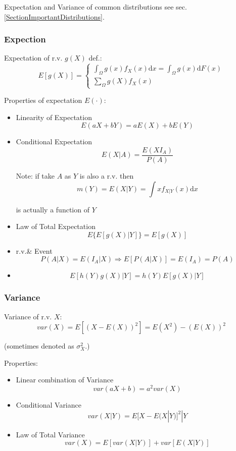    Expectation and Variance of common distributions see sec.\ref{SectionImportantDistributions}.

\subsubsection{Expection}
    Expectation of r.v. $g(X)$ def.:
    \[
    E[g(X)]=\begin{cases}
        {\displaystyle\int_\Omega g(x) f_X(x)\mathrm{d}x=\int_\Omega g(x)\mathrm{d}F(x)}\\
        {\displaystyle\sum_{\Omega}g(X)f_X(x)}
    \end{cases}
\]

    Properties of expectation $E(\cdot)$:
\begin{itemize}
    \item Linearity of Expectation\[
        E(aX+bY)=aE(X)+bE(Y)
    \]
    \item Conditional Expectation\[
        E(X|A)=\frac{E(XI_A)}{P(A)}
    \]
    
    Note: if take $A$ as $Y$ is also a r.v. then 
    \[m(Y)=E(X|Y)=\int xf_{X|Y}(x)\mathrm{d}x\]

    is actually a function of $Y$

    \item Law of Total Expectation\[
    E\{E[g(X)|Y]\}=E[g(X)]
    \]
    \item r.v.\& Event
    \[
        P(A|X)=E(I_A|X)\Rightarrow E[P(A|X)]=E(I_A)=P(A)
    \]
    \item \[
        E[h(Y)g(X)|Y]=h(Y)E[g(X)|Y]
    \]
\end{itemize}


\subsubsection{Variance}
    Variance of r.v. $X$: 
    \[
        var(X)=E[(X-E(X))^2]=E(X^2)-(E(X))^2
    \]

    (sometimes denoted as $\sigma^2_X$.)

    Properties:
\begin{itemize} 
    \item Linear combination of Variance\[
        var(aX+b)=a^2var(X)
    \]
    \item Conditional Variance
    \[
        var(X|Y)=E{[X-E(X|Y)]^2|Y}
    \]
    \item Law of Total Variance\[
        var(X)=E[var(X|Y)]+var[E(X|Y)]
    \]
\end{itemize}

